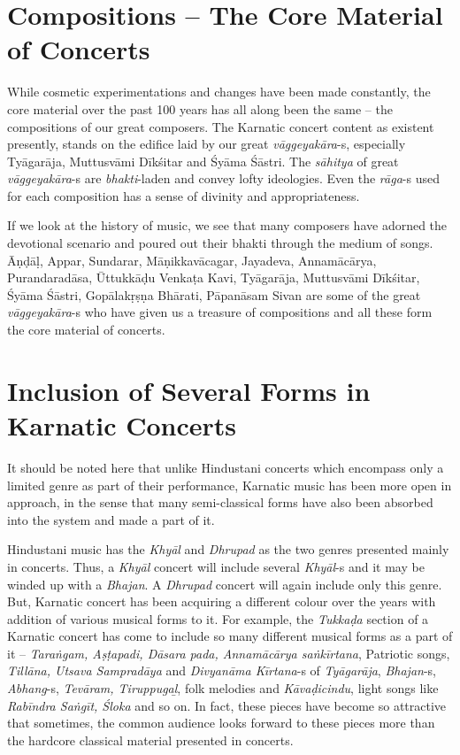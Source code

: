\section*{Compositions – The Core Material of Concerts}

While cosmetic experimentations and changes have been made constantly, the core material over the past 100 years has all along been the same – the compositions of our great composers. The Karnatic concert content as existent presently, stands on the edifice laid by our great \textit{vāggeyakāra}-s, especially Tyāgarāja, Muttusvāmi Dīkśitar and Śyāma Śāstri. The \textit{sāhitya} of great \textit{vāggeyakāra}-s are \textit{bhakti}-laden and convey lofty ideologies. Even the \textit{rāga}-s used for each composition has a sense of divinity and appropriateness.

If we look at the history of music, we see that many composers have adorned the devotional scenario and poured out their bhakti through the medium of songs. Āṇḍāḷ, Appar, Sundarar, Māṇikkavācagar, Jayadeva, Annamācārya, Purandaradāsa, Ūttukkāḍu Venkaṭa Kavi, Tyāgarāja, Muttusvāmi Dīkśitar, Śyāma Śāstri, Gopālakṛṣṇa Bhārati, Pāpanāsam Sivan are some of the great \textit{vāggeyakāra}-s who have given us a treasure of compositions and all these form the core material of concerts.

\vspace{-.3cm}

\section*{Inclusion of Several Forms in Karnatic Concerts}

It should be noted here that unlike Hindustani concerts which encompass only a limited genre as part of their performance, Karnatic music has been more open in approach, in the sense that many semi-classical forms have also been absorbed into the system and made a part of it.

Hindustani music has the \textit{Khyāl} and \textit{Dhrupad} as the two genres presented mainly in concerts. Thus, a \textit{Khyāl} concert will include several \textit{Khyāl}-s and it may be winded up with a \textit{Bhajan}. A \textit{Dhrupad} concert will again include only this genre. But, Karnatic concert has been acquiring a different colour over the years with addition of various musical forms to it. For example, the \textit{Tukkaḍa} section of a Karnatic concert has come to include so many different musical forms as a part of it – \textit{Taraṅgam, Aṣṭapadi, Dāsara pada, Annamācārya saṅkīrtana}, Patriotic songs, \textit{Tillāna, Utsava Sampradāya} and \textit{Divyanāma Kīrtana}-s of \textit{Tyāgarāja}, \textit{Bhajan}-s, \textit{Abhang}-s, \textit{Tevāram, Tiruppugaḻ}, folk melodies and \textit{Kāvaḍicindu}, light songs like \textit{Rabīndra Saṅgīt, Śloka} and so on. In fact, these pieces have become so attractive that sometimes, the common audience looks forward to these pieces more than the hardcore classical material presented in concerts.

